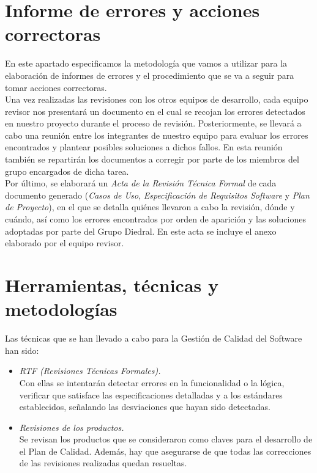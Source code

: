 \documentclass[11pt, a4paper, twoside, titlepage]{article}
\begin{document}
	\section{Informe de errores y acciones correctoras} %
		En este apartado especificamos la metodología que vamos a utilizar para la elaboración de informes de errores y el procedimiento que se va a seguir para tomar acciones correctoras. \\

		Una vez realizadas las revisiones con los otros equipos de desarrollo, cada equipo revisor nos presentará un documento en el cual se recojan los errores detectados en nuestro proyecto durante el proceso de revisión. Posteriormente, se llevará a cabo una reunión entre los integrantes de nuestro equipo para evaluar los errores encontrados y plantear posibles soluciones a dichos fallos. En esta reunión también se repartirán los documentos a corregir por parte de los miembros del grupo encargados de dicha tarea. \\

		Por último, se elaborará un \textit{Acta de la Revisión Técnica Formal} de cada documento generado (\textit{Casos de Uso}, \textit{Especificación de Requisitos Software} y \textit{Plan de Proyecto}), en el que se detalla quiénes llevaron a cabo la revisión, dónde y cuándo, así como los errores encontrados por orden de aparición %
 y las soluciones adoptadas por parte del Grupo Diedral. En este acta se incluye el anexo elaborado por el equipo revisor.
	
	\section{Herramientas, técnicas y metodologías} %
		Las técnicas que se han llevado a cabo para la Gestión de Calidad del Software han sido:

		\begin{itemize}
			\item \textit{RTF (Revisiones Técnicas Formales).} \\
				Con ellas se intentarán detectar errores en la funcionalidad o la lógica, verificar que satisface las especificaciones detalladas y a los estándares establecidos, señalando las desviaciones que hayan sido detectadas.
			\item \textit{Revisiones de los productos.} \\
				Se revisan los productos que se consideraron como claves para el desarrollo de el Plan de Calidad. Además, hay que asegurarse de que todas las correcciones de las revisiones realizadas quedan resueltas.
		 \end{itemize}
\end{document}
